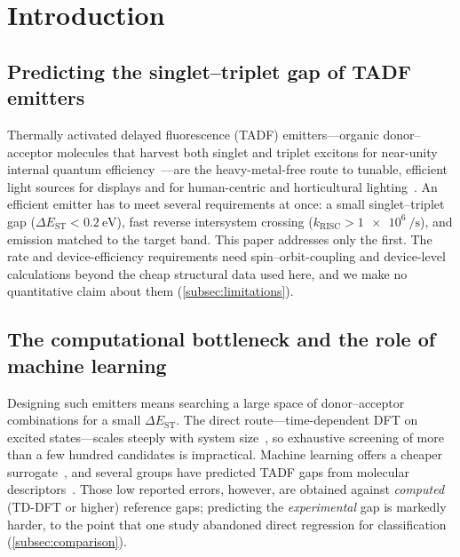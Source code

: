 
\section{Introduction}\label{sec:introduction}

\subsection{Predicting the singlet--triplet gap of TADF emitters}

Thermally activated delayed fluorescence (TADF) emitters---organic donor--acceptor
molecules that harvest both singlet and triplet excitons for near-unity internal
quantum efficiency~\cite{Uoyama2012}---are the heavy-metal-free route to tunable,
efficient light sources for displays and for human-centric and horticultural
lighting~\cite{Yokoyama_2018, Bugbee2016}. An efficient emitter has to meet several
requirements at once: a small singlet--triplet gap
($\Delta E_\text{ST} < \qty{0.2}{\electronvolt}$), fast reverse intersystem crossing
($k_\text{RISC} > \qty{1e6}{\per\second}$), and emission matched to the target band.
This paper addresses only the first. The rate and device-efficiency requirements need
spin--orbit-coupling and device-level calculations beyond the cheap structural data
used here, and we make no quantitative claim about them (\cref{subsec:limitations}).

\subsection{The computational bottleneck and the role of machine learning}

Designing such emitters means searching a large space of donor--acceptor
combinations for a small $\Delta E_\text{ST}$. The direct route---time-dependent
DFT on excited states---scales steeply with system size~\cite{Curtarolo2013},
so exhaustive screening of more than a few hundred candidates is impractical.
Machine learning offers a cheaper surrogate~\cite{Butler2018, Pyzer-Knapp2022},
and several groups have predicted TADF gaps from molecular
descriptors~\cite{Gomez-Bombarelli2016, Barneschi2024}. Those low reported errors,
however, are obtained against \emph{computed} (TD-DFT or higher) reference gaps;
predicting the \emph{experimental} gap is markedly harder, to the point that one
study abandoned direct regression for classification~\cite{Nigam2024}
(\cref{subsec:comparison}).

